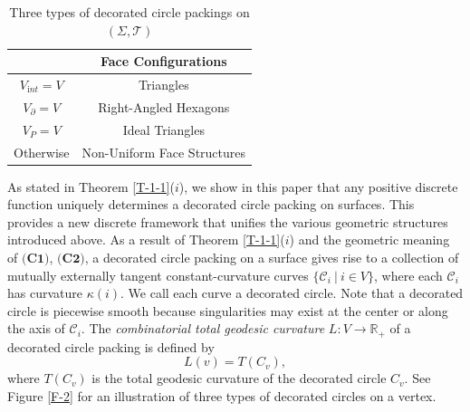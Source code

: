 \documentclass[11pt,leqno]{article}
\numberwithin{equation}{section}
\theoremstyle{definition}
\begin{document}
\begin{table}[ht]
\centering
\begin{tabular}{c|c}
\hline
 &  Face Configurations \\
\hline
$V_{\mathrm int}=V$ &  Triangles \\
\hline
$V_\partial=V$ &  Right-Angled Hexagons \\
\hline
$V_P=V$ &  Ideal Triangles \\
\hline
Otherwise &  Non-Uniform Face Structures \\
\hline
\end{tabular}
\caption{Three types of decorated circle packings on $(\Sigma,\mathcal T)$}
\label{T-1}
\end{table}
As stated in Theorem \ref{T-1-1}($i$), we show in this paper that any positive discrete function uniquely determines a decorated circle packing on surfaces.
This provides a new discrete framework that unifies the various geometric structures introduced above.
As a result of Theorem \ref{T-1-1}($i$) and the geometric meaning of $\textbf{(C1)}$, $\textbf{(C2)}$, a decorated circle packing on a surface gives rise to a collection of mutually externally tangent constant-curvature curves $\{\mathcal C_i\ |\ i\in V\}$, where each $\mathcal C_i$ has curvature $\kappa(i)$. We call each curve a decorated circle. Note that a decorated circle is piecewise smooth because singularities may exist at the center or along the axis of $\mathcal C_i$. The \emph{combinatorial total geodesic curvature} $L:V\to\mathbb{R}_+$ of a decorated circle packing is defined by
\[L(v)=T(C_v),\]
where $T(C_v)$ is the total geodesic curvature of the decorated circle $C_v$. See Figure \ref{F-2} for an illustration of three types of decorated circles on a vertex.
\end{document}
